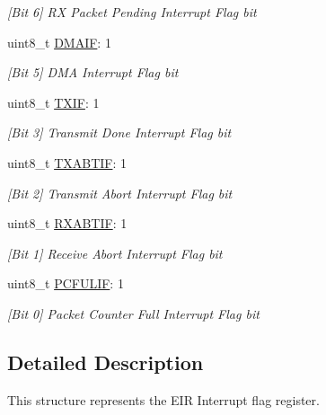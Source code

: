 \begin{DoxyCompactItemize}
\begin{DoxyCompactList}\small\item\em \mbox{[}Bit 6\mbox{]} RX Packet Pending Interrupt Flag bit \end{DoxyCompactList}\item 
uint8\+\_\+t \mbox{\hyperlink{structinterrupt_flags___ac03ab9621d33c1e860f64dbcf0fa2a3e}{D\+M\+A\+IF}}\+: 1
\begin{DoxyCompactList}\small\item\em \mbox{[}Bit 5\mbox{]} D\+MA Interrupt Flag bit \end{DoxyCompactList}\item 
uint8\+\_\+t \mbox{\hyperlink{structinterrupt_flags___a8ac6b64dff7b25ddf36cea5543329e56}{T\+X\+IF}}\+: 1
\begin{DoxyCompactList}\small\item\em \mbox{[}Bit 3\mbox{]} Transmit Done Interrupt Flag bit \end{DoxyCompactList}\item 
uint8\+\_\+t \mbox{\hyperlink{structinterrupt_flags___aef79dc4f43ab3844327f963cedfc3a57}{T\+X\+A\+B\+T\+IF}}\+: 1
\begin{DoxyCompactList}\small\item\em \mbox{[}Bit 2\mbox{]} Transmit Abort Interrupt Flag bit \end{DoxyCompactList}\item 
uint8\+\_\+t \mbox{\hyperlink{structinterrupt_flags___adfd2bd74bfbf9d086ac5364f2c2bc420}{R\+X\+A\+B\+T\+IF}}\+: 1
\begin{DoxyCompactList}\small\item\em \mbox{[}Bit 1\mbox{]} Receive Abort Interrupt Flag bit \end{DoxyCompactList}\item 
uint8\+\_\+t \mbox{\hyperlink{structinterrupt_flags___a54ca36edd15d3a43ea58c44c9b4632d1}{P\+C\+F\+U\+L\+IF}}\+: 1
\begin{DoxyCompactList}\small\item\em \mbox{[}Bit 0\mbox{]} Packet Counter Full Interrupt Flag bit \end{DoxyCompactList}\end{DoxyCompactItemize}


\subsection{Detailed Description}
This structure represents the E\+IR Interrupt flag register. 

